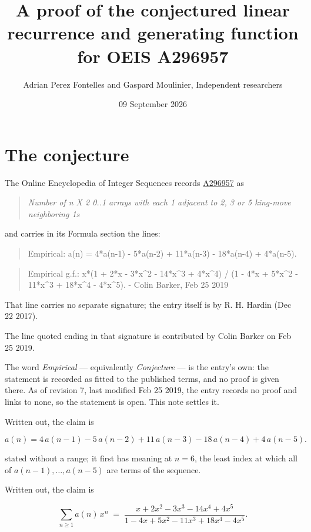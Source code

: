 \documentclass[11pt]{article}
\title{A proof of the conjectured linear recurrence and generating function for OEIS A296957}
\author{Adrian Perez Fontelles and Gaspard Moulinier, Independent researchers}
\date{09 September 2026}
\theoremstyle{definition}
\begin{document}
\maketitle
\section{The conjecture}

The Online Encyclopedia of Integer Sequences records \href{https://oeis.org/A296957}{A296957} as

\begin{quote}\itshape Number of n X 2 0..1 arrays with each 1 adjacent to 2, 3 or 5 king-move neighboring 1s\end{quote}

and carries in its Formula section the lines:

\begin{quote}\ttfamily Empirical: a(n) = 4*a(n-1) - 5*a(n-2) + 11*a(n-3) - 18*a(n-4) + 4*a(n-5).\end{quote}

\begin{quote}\ttfamily Empirical g.f.: x*(1 + 2*x - 3*x\textasciicircum{}2 - 14*x\textasciicircum{}3 + 4*x\textasciicircum{}4) / (1 - 4*x + 5*x\textasciicircum{}2 - 11*x\textasciicircum{}3 + 18*x\textasciicircum{}4 - 4*x\textasciicircum{}5). - Colin Barker, Feb 25 2019\end{quote}

That line carries no separate signature; the entry itself is by R. H. Hardin (Dec 22 2017).

The line quoted ending in that signature is contributed by Colin Barker on Feb 25 2019.

The word {\itshape Empirical} --- equivalently {\itshape Conjecture} --- is the entry's own: the statement is recorded as fitted to the published terms, and no proof is given there. As of revision 7, last modified Feb 25 2019, the entry records no proof and links to none, so the statement is open. This note settles it.

Written out, the claim is

\[a(n) = 4\,a(n-1) - 5\,a(n-2) + 11\,a(n-3) - 18\,a(n-4) + 4\,a(n-5).\]

stated without a range; it first has meaning at $n = 6$, the least index at which all of $a(n-1),\dots,a(n-5)$ are terms of the sequence.

Written out, the claim is

\[\sum_{n \ge 1} a(n)\,x^n \;=\; \frac{x + 2x^{2} - 3x^{3} - 14x^{4} + 4x^{5}}{1 - 4x + 5x^{2} - 11x^{3} + 18x^{4} - 4x^{5}}.\]
\end{document}
